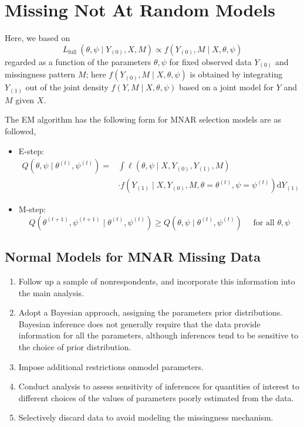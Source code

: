 \section{Missing Not At Random Models}

Here, we based on
\begin{equation}
	L_{\text {full }}\left(\theta, \psi \mid Y_{(0)}, X, M\right) \propto f\left(Y_{(0)}, M \mid X, \theta, \psi\right)
\end{equation}
regarded as a function of the parameters $\theta, \psi$ for fixed observed data $Y_{(0)}$ and missingness pattern $M$; here $f\left(Y_{(0)}, M \mid X, \theta, \psi\right)$ is obtained by integrating $Y_{(1)}$ out of the joint density $f(Y, M \mid X, \theta, \psi)$ based on a joint model for $Y$ and $M$ given $X$.

The EM algorithm has the following form for MNAR selection models are as followed,
\begin{itemize}
	\item E-step:
	      \begin{equation}
		      \begin{aligned}
			      Q\left(\theta, \psi \mid \theta^{(t)}, \psi^{(t)}\right)= & \int \ell\left(\theta, \psi \mid X, Y_{(0)}, Y_{(1)}, M\right)                                         \\
			                                                                & \cdot f\left(Y_{(1)}\mid X, Y_{(0)}, M, \theta=\theta^{(t)}, \psi=\psi^{(t)}\right) \mathrm{d} Y_{(1)}
		      \end{aligned}
	      \end{equation}
	\item M-step:
	      \begin{equation}
		      Q\left(\theta^{(t+1)}, \psi^{(t+1)} \mid \theta^{(t)}, \psi^{(t)}\right) \geq Q\left(\theta, \psi \mid \theta^{(t)}, \psi^{(t)}\right) \quad \text { for all } \theta, \psi
	      \end{equation}
\end{itemize}

\subsection{Normal Models for MNAR Missing Data}

\begin{enumerate}
	\item Follow up a sample of nonrespondents, and incorporate this information into the main analysis.
	\item Adopt a Bayesian approach, assigning the parameters prior distributions. Bayesian inference does not generally require that the data provide information for all the parameters, although inferences tend to be sensitive to
	      the choice of prior distribution.
	\item Impose additional restrictions onmodel parameters.
	\item Conduct analysis to assess sensitivity of inferences for quantities of interest to different choices of the values of parameters poorly estimated from the data.
	\item Selectively discard data to avoid modeling the missingness mechanism.
\end{enumerate}
